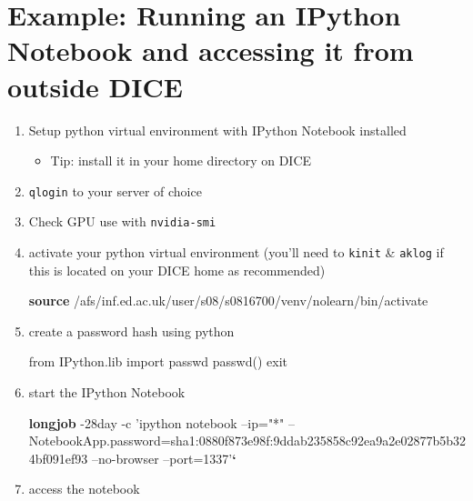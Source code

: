 \documentclass[]{article}
\newenvironment{Shaded}{\begin{snugshade}}{\end{snugshade}}
\newcommand{\KeywordTok}[1]{\textcolor[rgb]{0.13,0.29,0.53}{\textbf{{#1}}}}
\newcommand{\CharTok}[1]{\textcolor[rgb]{0.31,0.60,0.02}{{#1}}}
\newcommand{\StringTok}[1]{\textcolor[rgb]{0.31,0.60,0.02}{{#1}}}
\newcommand{\NormalTok}[1]{{#1}}
\begin{document}
\section{Example: Running an IPython Notebook and accessing it from
outside
DICE}\label{example-running-an-ipython-notebook-and-accessing-it-from-outside-dice}

\begin{enumerate}
\def\labelenumi{\arabic{enumi}.}
\item
  Setup python virtual environment with IPython Notebook installed

  \begin{itemize}
  \itemsep1pt\parskip0pt
  \item
    Tip: install it in your home directory on DICE
  \end{itemize}
\item
  \texttt{qlogin} to your server of choice
\item
  Check GPU use with \texttt{nvidia-smi}
\item
  activate your python virtual environment (you'll need to
  \texttt{kinit} \& \texttt{aklog} if this is located on your DICE home
  as recommended)

\begin{Shaded}
\begin{Highlighting}[]
\KeywordTok{source} \NormalTok{/afs/inf.ed.ac.uk/user/s08/s0816700/venv/nolearn/bin/activate}
\end{Highlighting}
\end{Shaded}
\item
  create a password hash using python

\begin{Shaded}
\begin{Highlighting}[]
\CharTok{from} \NormalTok{IPython.lib }\CharTok{import} \NormalTok{passwd}
\NormalTok{passwd()}
\NormalTok{exit}
\end{Highlighting}
\end{Shaded}
\item
  start the IPython Notebook

\begin{Shaded}
\begin{Highlighting}[]
\KeywordTok{longjob} \NormalTok{-28day -c }\StringTok{'ipython notebook  --ip="*" --NotebookApp.password=sha1:0880f873e98f:9ddab235858c92ea9a2e02877b5b324bf091ef93 --no-browser --port=1337'}\KeywordTok{`}
\end{Highlighting}
\end{Shaded}
\item
  access the notebook


\end{enumerate}
\end{document}
